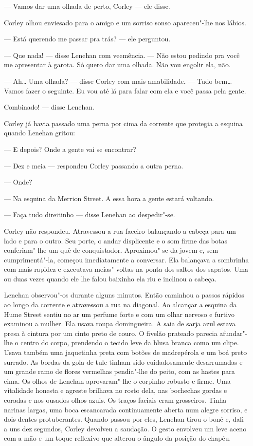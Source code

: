 --- Vamos dar uma olhada de perto, Corley --- ele disse.

Corley olhou enviesado para o amigo e um sorriso sonso apareceu"-lhe nos lábios.

--- Está querendo me passar pra trás? --- ele perguntou.

--- Que nada! --- disse Lenehan com veemência.  --- Não estou pedindo pra você
me apresentar à garota.  Só quero dar uma olhada.  Não vou engolir ela, não.

--- Ah\ldots{} Uma olhada? --- disse Corley com mais amabilidade.  --- Tudo
bem\ldots{} Vamos fazer o seguinte.  Eu vou até lá para falar com ela e você
passa pela gente.

Combinado! --- disse Lenehan.

Corley já havia passado uma perna por cima da corrente que protegia a esquina
quando Lenehan gritou:

--- E depois?  Onde a gente vai se encontrar?

--- Dez e meia --- respondeu Corley passando a outra perna.

--- Onde?

--- Na esquina da Merrion Street.  A essa hora a gente estará voltando.

--- Faça tudo direitinho --- disse Lenehan ao despedir"-se.

Corley não respondeu.  Atravessou a rua faceiro balançando a cabeça para um
lado e para o outro.  Seu porte, o andar displicente e o som firme das botas
conferiam"-lhe um quê de conquistador.  Aproximou"-se da jovem e, sem
cumprimentá"-la, começou imediatamente a conversar.  Ela balançava a sombrinha
com mais rapidez e executava meias"-voltas na ponta dos saltos dos sapatos.  Uma
ou duas vezes quando ele lhe falou baixinho ela riu e inclinou a cabeça.

Lenehan observou"-os durante alguns minutos.  Então caminhou a passos rápidos ao
longo da corrente e atravessou a rua na diagonal.  Ao alcançar a esquina da
Hume Street sentiu no ar um perfume forte e com um olhar nervoso e furtivo
examinou a mulher.  Ela usava roupa domingueira.  A saia de sarja azul estava
presa à cintura por um cinto preto de couro.  O fivelão prateado parecia
afundar"-lhe o centro do corpo, prendendo o tecido leve da blusa branca como um
clipe.  Usava também uma jaquetinha preta com botões de madrepérola e um boá
preto surrado.  As bordas da gola de tule tinham sido cuidadosamente
desarrumadas e um grande ramo de flores vermelhas pendia"-lhe do peito, com as
hastes para cima.  Os olhos de Lenehan aprovaram"-lhe o corpinho robusto e
firme.  Uma vitalidade honesta e agreste brilhava no rosto dela, nas bochechas
gordas e coradas e nos ousados olhos azuis.  Os traços faciais eram grosseiros.
Tinha narinas largas, uma boca escancarada continuamente aberta num alegre
sorriso, e dois dentes protuberantes.  Quando passou por eles, Lenehan tirou o
boné e, dali a uns dez segundos, Corley devolveu a saudação.  O gesto envolveu
um leve aceno com a mão e um toque reflexivo que alterou o ângulo da posição do
chapéu.

